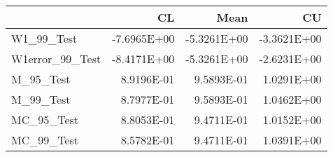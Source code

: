 \begin{tabular}{lrrr}
\toprule
{} &          CL &        Mean &          CU \\
\midrule
W1\_99\_Test      & -7.6965E+00 & -5.3261E+00 & -3.3621E+00 \\
W1error\_99\_Test & -8.4171E+00 & -5.3261E+00 & -2.6231E+00 \\
M\_95\_Test       &  8.9196E-01 &  9.5893E-01 &  1.0291E+00 \\
M\_99\_Test       &  8.7977E-01 &  9.5893E-01 &  1.0462E+00 \\
MC\_95\_Test      &  8.8053E-01 &  9.4711E-01 &  1.0152E+00 \\
MC\_99\_Test      &  8.5782E-01 &  9.4711E-01 &  1.0391E+00 \\
\bottomrule
\end{tabular}
